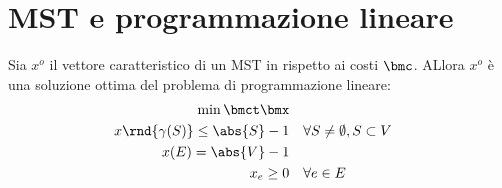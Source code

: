 \documentclass[\main/main.tex]{subfiles}
\begin{document}
\section{MST e programmazione lineare}
\begin{theorem}
  Sia \(x^o\) il vettore caratteristico di un MST in rispetto ai costi \(\bmc \). ALlora \(x^o\) è una soluzione ottima del problema di programmazione lineare:
  \begin{align*}
    \min \bmct\bmx                                                                 \\
    x\rnd{\gamma(S)} \leq \abs{S} -1 & \quad \forall S \neq \emptyset, S \subset V \\
    x(E) = \abs{V} -1                                                              \\
    x_e \geq 0                       & \quad \forall e \in E
  \end{align*}
\end{theorem}
\end{document}

